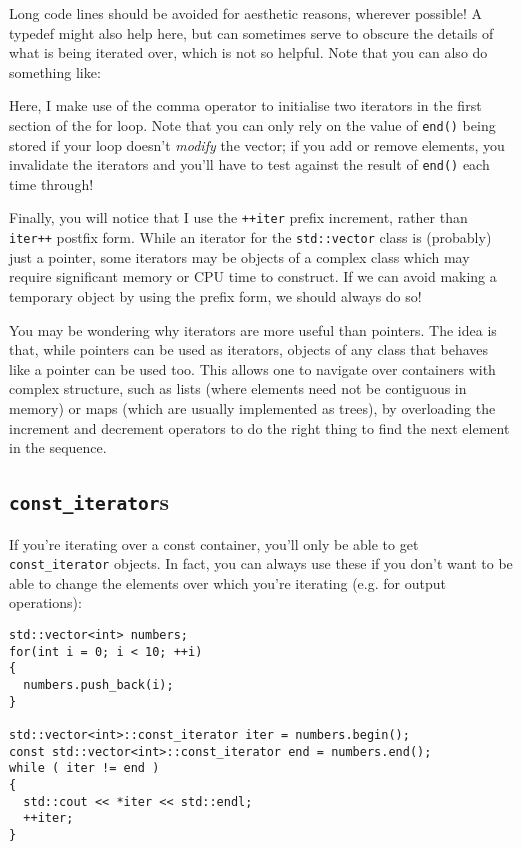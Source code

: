 \documentclass[a4paper]{scrartcl}
\begin{document}


Long code lines should be avoided for aesthetic reasons, wherever possible! A typedef might also help here, but can sometimes serve to obscure the details of what is being iterated over, which is not so helpful. Note that you can also do something like:



Here, I make use of the comma operator to initialise two iterators in the first section of the for loop. Note that you can only rely on the value of \verb|end()| being stored if your loop doesn't \emph{modify} the vector; if you add or remove elements, you invalidate the iterators and you'll have to test against the result of \verb|end()| each time through!

Finally, you will notice that I use the \verb|++iter| prefix increment, rather than \verb|iter++| postfix form. While an iterator for the \verb|std::vector| class is (probably) just a pointer, some iterators may be objects of a complex class which may require significant memory or CPU time to construct. If we can avoid making a temporary object by using the prefix form, we should always do so!

You may be wondering why iterators are more useful than pointers. The idea is that, while pointers can be used as iterators, objects of any class that behaves like a pointer can be used too. This allows one to navigate over containers with complex structure, such as lists (where elements need not be contiguous in memory) or maps (which are usually implemented as trees), by overloading the increment and decrement operators to do the right thing to find the next element in the sequence.

\subsection{\texttt{const\_iterator}s}
If you're iterating over a const container, you'll only be able to get \verb|const_iterator| objects. In fact, you can always use these if you don't want to be able to change the elements over which you're iterating (e.g. for output operations):

\begin{verbatim}
std::vector<int> numbers;
for(int i = 0; i < 10; ++i)
{
  numbers.push_back(i);
}

std::vector<int>::const_iterator iter = numbers.begin();
const std::vector<int>::const_iterator end = numbers.end();
while ( iter != end )
{
  std::cout << *iter << std::endl;
  ++iter;
}
\end{verbatim}
\end{document}
